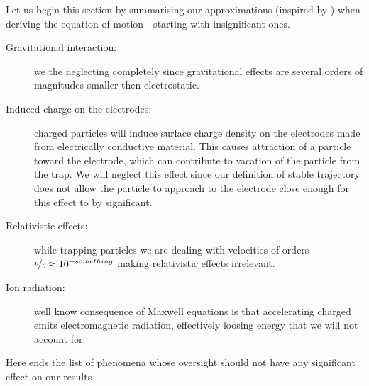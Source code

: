 Let us begin this section by summarising our approximations (inspired by \cite{Friedman_1982}) when deriving the equation of motion—starting with insignificant ones. 
\begin{description}
	\item[Gravitational interaction:] we the neglecting completely since gravitational effects are several orders of magnitudes smaller then electrostatic.
	\item[Induced charge on the electrodes:] charged particles will induce surface charge density on the electrodes made from electrically conductive material. This causes attraction of a particle toward the electrode, which can contribute to vacation of the particle from the trap. We will neglect this effect since our definition of stable trajectory does not allow the particle to approach to the electrode close enough for this effect to by significant.
	\item[Relativistic effects:] while trapping particles we are dealing with velocities of orders $\nicefrac{v}{c} \approx 10^{-something}$ making relativistic effects irrelevant.
	\item[Ion radiation:] well know consequence of Maxwell equations is that accelerating charged emits electromagnetic radiation, effectively loosing energy that we will not account for.
\end{description}


	
Here ends the list of phenomena whose oversight should not have any significant effect on our results


